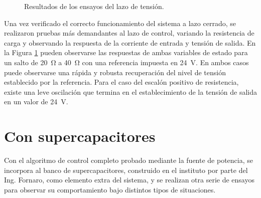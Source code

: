 \begin{figure}[hbt!]
  \centering
  \caption{Resultados de los ensayos del lazo de tensión.}
  \label{var-r-lazo-tension}
\end{figure}

Una vez verificado el correcto funcionamiento del sistema a lazo cerrado, se realizaron pruebas más demandantes al lazo de control, variando la resistencia de carga y observando la respuesta de la corriente de entrada y tensión de salida. En la Figura \ref{var-r-lazo-tension} pueden observarse las respuestas de ambas variables de estado para un salto de \SI{20}{\ohm} a \SI{40}{\ohm} con una referencia impuesta en \SI{24}{\volt}. En ambos casos puede observarse una rápida y robusta recuperación del nivel de tensión establecido por la referencia. Para el caso del escalón positivo de resistencia, existe una leve oscilación que termina en el establecimiento de la tensión de salida en un valor de \SI{24}{\volt}.



\section{Con supercapacitores}

Con el algoritmo de control completo probado mediante la fuente de potencia, se incorpora al banco de supercapacitores, construido en el instituto por parte del Ing. Fornaro, como elemento extra del sistema, y se realizan otra serie de ensayos para observar su comportamiento bajo distintos tipos de situaciones.

